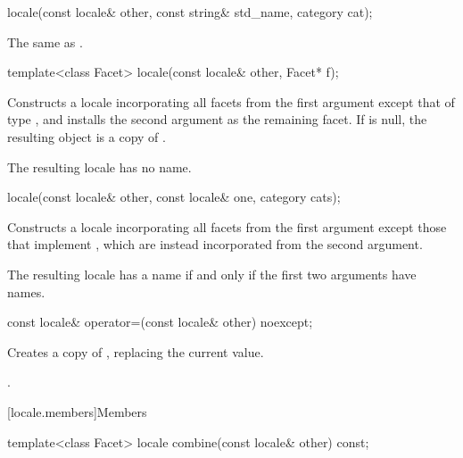 %
\begin{itemdecl}
locale(const locale& other, const string& std_name, category cat);
\end{itemdecl}

\begin{itemdescr}
\pnum
\effects
The same as .
\end{itemdescr}

%
\begin{itemdecl}
template<class Facet> locale(const locale& other, Facet* f);
\end{itemdecl}

\begin{itemdescr}
\pnum
\effects
Constructs a locale incorporating all facets from the first
argument except that of type
,
and installs the second argument as the remaining facet.
If 
is null, the resulting object is a copy of .

\pnum
\remarks
The resulting locale has no name.
\end{itemdescr}

%
\begin{itemdecl}
locale(const locale& other, const locale& one, category cats);
\end{itemdecl}

\begin{itemdescr}
\pnum
\effects
Constructs a locale incorporating all facets from the first argument
except those that implement
,
which are instead incorporated from the second argument.

\pnum
\remarks
The resulting locale has a name if and only if the first two arguments
have names.
\end{itemdescr}

%
\begin{itemdecl}
const locale& operator=(const locale& other) noexcept;
\end{itemdecl}

\begin{itemdescr}
\pnum
\effects
Creates a copy of , replacing the current value.

\pnum
\returns
{}.
\end{itemdescr}

[locale.members]{Members}

%
\begin{itemdecl}
template<class Facet> locale combine(const locale& other) const;
\end{itemdecl}

